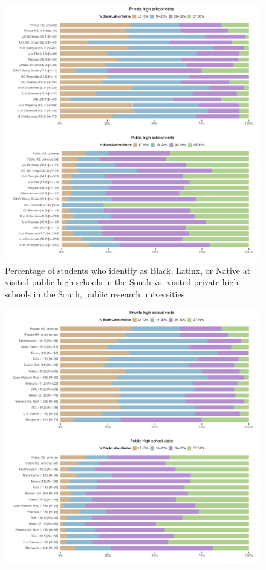\documentclass[
  12pt,
]{article}
\begin{document}
\begin{landscape}
\begin{figure}
{\centering \includegraphics[width=2\linewidth]{../assets/figures/south_race_pubu_privhs_pubhs} 

}

\caption{Percentage of students who identify as Black, Latinx, or Native at visited public high schools in the South vs. visited private high schools in the South, public research universities}\label{fig:south-race-pubu-privhs-pubhs}
\end{figure}

\newpage

\begin{figure}

{\centering \includegraphics[width=2\linewidth]{../assets/figures/south_race_privu_privhs_pubhs} 

}
\end{figure}
\end{landscape}
\end{document}
